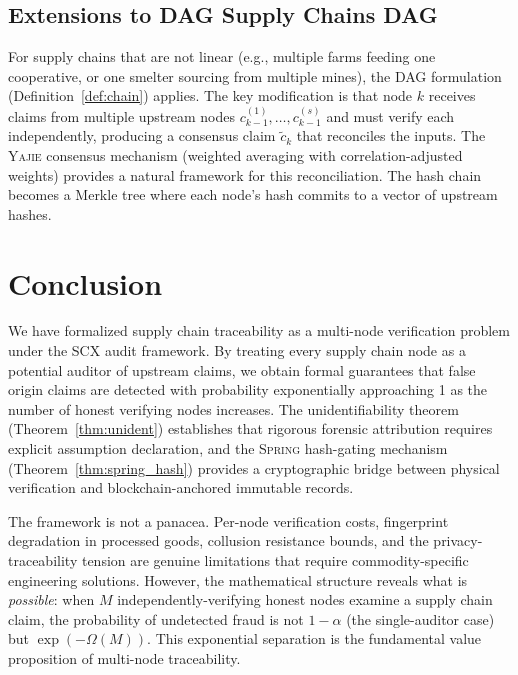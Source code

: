 \documentclass[11pt,a4paper]{article}
\theoremstyle{definition}
\theoremstyle{remark}
\newcommand{\SCX}{\textsc{SCX}}
\newcommand{\Yajie}{\textsc{Yajie}}
\newcommand{\Spring}{\textsc{Spring}}
\begin{document}
\subsection{Extensions to DAG Supply Chains DAG}

For supply chains that are not linear (e.g., multiple farms feeding one cooperative, or one smelter sourcing from multiple mines), the DAG formulation (Definition~\ref{def:chain}) applies. The key modification is that node $k$ receives claims from multiple upstream nodes $c_{k-1}^{(1)}, \ldots, c_{k-1}^{(s)}$ and must verify each independently, producing a consensus claim $\tilde{c}_k$ that reconciles the inputs. The \Yajie{} consensus mechanism (weighted averaging with correlation-adjusted weights) provides a natural framework for this reconciliation. The hash chain becomes a Merkle tree where each node's hash commits to a vector of upstream hashes.

\section{Conclusion }

We have formalized supply chain traceability as a multi-node verification problem under the \SCX{} audit framework. By treating every supply chain node as a potential auditor of upstream claims, we obtain formal guarantees that false origin claims are detected with probability exponentially approaching 1 as the number of honest verifying nodes increases. The unidentifiability theorem (Theorem~\ref{thm:unident}) establishes that rigorous forensic attribution requires explicit assumption declaration, and the \Spring{} hash-gating mechanism (Theorem~\ref{thm:spring_hash}) provides a cryptographic bridge between physical verification and blockchain-anchored immutable records.

The framework is not a panacea. Per-node verification costs, fingerprint degradation in processed goods, collusion resistance bounds, and the privacy-traceability tension are genuine limitations that require commodity-specific engineering solutions. However, the mathematical structure reveals what is \textit{possible}: when $M$ independently-verifying honest nodes examine a supply chain claim, the probability of undetected fraud is not $1 - \alpha$ (the single-auditor case) but $\exp(-\Omega(M))$. This exponential separation is the fundamental value proposition of multi-node traceability.
\end{document}
